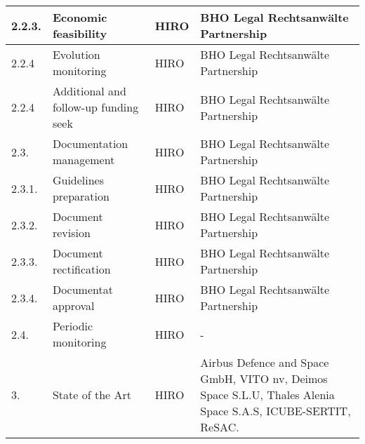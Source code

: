 \begin{longtable}[H]{p{1.5cm} >{\raggedright\arraybackslash}p{4cm} >{\raggedright\arraybackslash}p{3.8cm} >{\raggedright\arraybackslash}p{4cm}}
	2.2.3. & Economic feasibility & HIRO & BHO Legal Rechtsanwälte Partnership\vspace{0.2cm} \\
	
	\midrule
	
	2.2.4 & Evolution monitoring & HIRO & BHO Legal Rechtsanwälte Partnership\vspace{0.2cm} \\
	
	\midrule
	
	2.2.4 & Additional and follow-up funding seek & HIRO & BHO Legal Rechtsanwälte Partnership\vspace{0.2cm} \\
	
	\midrule
	
	2.3. & Documentation management & HIRO & BHO Legal Rechtsanwälte Partnership\vspace{0.2cm} \\
	
	\midrule
	
	2.3.1. & Guidelines preparation & HIRO & BHO Legal Rechtsanwälte Partnership\vspace{0.2cm} \\
	
	\midrule
	
	2.3.2. & Document revision & HIRO & BHO Legal Rechtsanwälte Partnership\vspace{0.2cm} \\
	
	\midrule
	
	2.3.3. & Document rectification & HIRO & BHO Legal Rechtsanwälte Partnership\vspace{0.2cm} \\
	
	\midrule
	
	2.3.4. & Documentat approval & HIRO & BHO Legal Rechtsanwälte Partnership\vspace{0.2cm} \\
	
	\midrule
	
	2.4. & Periodic monitoring & HIRO & -\vspace{0.2cm} \\
	
	\midrule
	
	3. & State of the Art & HIRO & Airbus Defence and Space GmbH, VITO nv, Deimos Space S.L.U, Thales Alenia Space S.A.S, ICUBE-SERTIT, ReSAC.\vspace{0.2cm} \\
	

\end{longtable}
